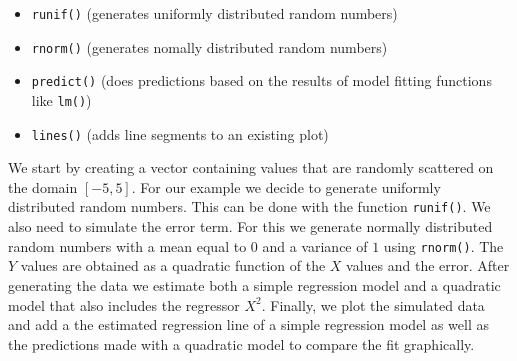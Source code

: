 \documentclass[]{book}
\providecommand{\tightlist}{%
  \setlength{\itemsep}{0pt}\setlength{\parskip}{0pt}}
\theoremstyle{definition}
\theoremstyle{definition}
\theoremstyle{definition}
\theoremstyle{remark}
\begin{document}
\begin{itemize}
\tightlist
\item
  \texttt{runif()} (generates uniformly distributed random numbers)
\item
  \texttt{rnorm()} (generates nomally distributed random numbers)
\item
  \texttt{predict()} (does predictions based on the results of model
  fitting functions like \texttt{lm()})
\item
  \texttt{lines()} (adds line segments to an existing plot)
\end{itemize}

We start by creating a vector containing values that are randomly
scattered on the domain \([-5,5]\). For our example we decide to
generate uniformly distributed random numbers. This can be done with the
function \texttt{runif()}. We also need to simulate the error term. For
this we generate normally distributed random numbers with a mean equal
to \(0\) and a variance of \(1\) using \texttt{rnorm()}. The \(Y\)
values are obtained as a quadratic function of the \(X\) values and the
error. After generating the data we estimate both a simple regression
model and a quadratic model that also includes the regressor \(X^2\).
Finally, we plot the simulated data and add a the estimated regression
line of a simple regression model as well as the predictions made with a
quadratic model to compare the fit graphically.
\end{document}
